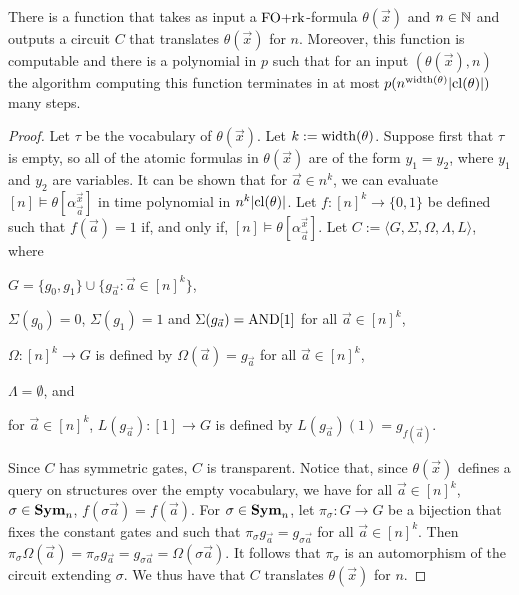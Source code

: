 \documentclass[../paper.tex]{subfiles}
\begin{document}
\begin{lem}
  There is a function that takes as input a $\text{\upshape FO+rk}$-formula $\theta(\vec{x})$
  and $n \in \mathbb{N}$ and outputs a circuit $C$ that translates $\theta(\vec{x})$
  for $n$. Moreover, this function is computable and there is a polynomial in
  $p$ such that for an input $(\theta(\vec{x}), n)$ the algorithm computing this
  function terminates in at most $p(n^{\mathrm{width}(\theta)}\vert \mathrm{cl}(\theta) \vert)$
  many steps.
  \label{lem:translating-FOrk}
\end{lem}
\begin{proof}
  Let $\tau$ be the vocabulary of $\theta(\vec{x})$. Let $k := \mathrm{width}(\theta)$.
  Suppose first that $\tau$ is empty, so
  all of the atomic formulas in $\theta(\vec{x})$ are of the form $y_1 = y_2$,
  where $y_1$ and $y_2$ are variables.  It can be shown that for $\vec{a} \in
  n^k$, we can evaluate $[n] \models \theta[\alpha^{\vec{x}}_{\vec{a}}]$ in time
  polynomial in $n^{k} \vert \mathrm{cl}(\theta) \vert$. Let $f : [n]^k \rightarrow
  \{0,1\}$ be defined such that $f (\vec{a}) = 1$ if, and only if, $[n] \models
  \theta[\alpha^{\vec{x}}_{\vec{a}}]$. Let $C := \langle G, \Sigma, \Omega,
  \Lambda, L \rangle$, where
  \begin{myitemize}
  \item $G = \{g_0, g_1\} \cup \{g_{\vec{a}} : \vec{a} \in [n]^{k}\}$,
  \item $\Sigma (g_0) = 0$, $\Sigma (g_1) = 1$ and $\Sigma (g_{\vec{a}}) =
    \text{\upshape AND}[1]$ for all $\vec{a} \in [n]^k$,
  \item $\Omega : [n]^k \rightarrow G$ is defined by $\Omega(\vec{a}) =
    g_{\vec{a}}$ for all $\vec{a} \in [n]^k$,
  \item $\Lambda = \emptyset$, and
  \item for $\vec{a} \in [n]^k$, $L(g_{\vec{a}}) : [1] \rightarrow G$ is defined
    by $L(g_{\vec{a}})(1) = g_{f(\vec{a})}$.
  \end{myitemize}
  
  Since $C$ has symmetric gates, $C$ is transparent. Notice that, since
  $\theta(\vec{x})$ defines a query on structures over the empty vocabulary, we
  have for all $\vec{a} \in [n]^k$, $\sigma \in \text{\textbf{Sym}}_n$, $f(\sigma \vec{a}) =
  f(\vec{a})$. For $\sigma \in \text{\textbf{Sym}}_n$, let $\pi_\sigma : G \rightarrow G$ be a
  bijection that fixes the constant gates and such that $\pi_{\sigma}
  g_{\vec{a}} = g_{\sigma \vec{a}}$ for all $\vec{a} \in [n]^k$. Then
  $\pi_\sigma \Omega (\vec{a}) = \pi_\sigma g_{\vec{a}} = g_{\sigma \vec{a}} =
  \Omega (\sigma \vec{a})$. It follows that $\pi_\sigma$ is an automorphism of
  the circuit extending $\sigma$. We thus have that $C$ translates
  $\theta(\vec{x})$ for $n$.


\end{proof}
\end{document}
